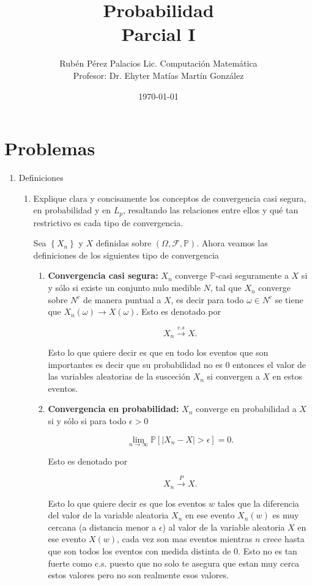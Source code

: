 \documentclass[letterpaper]{article}
\title{Probabilidad \\Parcial I}
\author{Rubén Pérez Palacios Lic. Computación Matemática\\Profesor: Dr. Ehyter Matías Martín González}
\date{\today}
\theoremstyle{definition}
\theoremstyle{lemathm}
\theoremstyle{lemademthm}
\newcommand{\limninf}{\lim_{n\to\infty}}
\newcommand{\abs}[1]{\left| #1 \right| }
\newcommand{\bracs}[1]{\left[ #1 \right] }
\newcommand{\set}[1]{\left \{ #1 \right\} }
\newcommand{\1}{\mathbbm{1}}
\begin{document}
	\maketitle
    
    \section*{Problemas}

    \begin{enumerate}
        
		\item Definiciones
		
		\begin{enumerate}
			\item Explique clara y concisamente los conceptos de convergencia casi segura, en probabilidad y en $L_p$, resaltando las relaciones entre ellos y qué tan restrictivo es cada tipo de convergencia.
			
			Sea $\set{X_n}$ y $X$ definidas sobre $(\Omega, \mathcal{F}, \mathbb{P})$. Ahora veamos las definiciones de los siguientes tipo de convergencia

			\begin{enumerate}
				\item \textbf{Convergencia casi segura:} $X_n$ converge $\mathbb{P}$-casi seguramente a $X$ si y sólo si existe un conjunto nulo medible $N$, tal que $X_n$ converge sobre $N^c$ de manera puntual a $X$, es decir para todo $\omega\in N^c$ se tiene que $X_n(\omega) \rightarrow X(\omega)$. Esto es denotado por
				
				\[X_n \xrightarrow{c.s} X.\]

				Esto lo que quiere decir es que en todo los eventos que son importantes es decir que su probabilidad no es $0$ entonces el valor de las variables aleatorias de la susceción $X_n$ si convergen a $X$ en estos eventos.

				\item \textbf{Convergencia en probabilidad:} $X_n$ converge en probabilidad a $X$ si y sólo si para todo $\epsilon > 0$
				
				\[\limninf \mathbb{P}\bracs{\abs{X_n-X} > \epsilon} = 0.\]

				Esto es denotado por
				
				\[X_n \xrightarrow{P} X.\]

				Esto lo que quiere decir es que los eventos $w$ tales que la diferencia del valor de la variable aleatoria $X_n$ en ese evento $X_n(w)$ es muy cercana (a distancia menor a $\epsilon$) al valor de la variable aleatoria $X$ en ese evento $X(w)$, cada vez son mas eventos mientras $n$ crece hasta que son todos los eventos con medida distinta de $0$. Esto no es tan fuerte como c.s. puesto que no solo te asegura que estan muy cerca estos valores pero no son realmente esos valores.


\end{enumerate}
\end{enumerate}
\end{enumerate}
\end{document}
